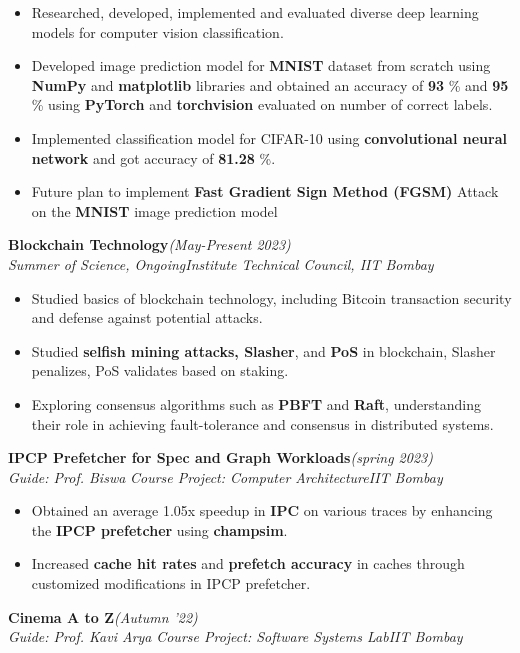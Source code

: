 \documentclass[10 pt]{article}
\begin{document}
		\begin{itemize}[itemsep = -0.8 mm, leftmargin=*]
		\vspace{-16pt}
		\item  Researched, developed, implemented and evaluated diverse deep learning models for computer vision classification.
		\item Developed image prediction model for \textbf{MNIST} dataset from scratch using \textbf{NumPy} and \textbf{matplotlib} libraries
  and obtained an accuracy of \textbf{93} \% and \textbf{95} \% using \textbf{PyTorch} and \textbf{torchvision} evaluated on number of correct labels.
		\item Implemented classification model for CIFAR-10 using \textbf{convolutional neural network} and got accuracy of \textbf{81.28} \%.
		\item  Future plan to implement \textbf{Fast Gradient Sign Method (FGSM)} Attack on the \textbf{MNIST} image prediction model
	\end{itemize}
 {\selectfont
		\textbf{{Blockchain Technology}}\hfill{\sl \small (May-Present 2023)}\\
	}{\it Summer of Science, Ongoing}\hfill{\sl \small Institute Technical Council, IIT Bombay}\\

		\begin{itemize}[itemsep = -0.8 mm, leftmargin=*]
		\vspace{-16pt}
		\item  Studied basics of blockchain technology, including Bitcoin transaction security and defense against potential attacks.
  \item Studied \textbf{selfish mining attacks, Slasher}, and \textbf{PoS} in blockchain, Slasher penalizes, PoS validates based on staking.
  \item Exploring consensus algorithms such as \textbf{PBFT} and \textbf{Raft}, understanding their role in achieving fault-tolerance and consensus in distributed systems.
	\end{itemize}
 	{\selectfont
		\textbf{{IPCP Prefetcher for Spec and Graph Workloads}}\hfill{\sl \small (spring 2023)}\\
	}{\it Guide: Prof. Biswa \textbar} {\it Course Project:  Computer Architecture}\hfill{\sl \small IIT Bombay}\\
	\begin{itemize}[itemsep = -0.8 mm, leftmargin=*]
		\vspace{-16pt}
		\item Obtained an average 1.05x speedup in \textbf{IPC} on various traces by enhancing the \textbf{IPCP prefetcher} using \textbf{champsim}.
		\item Increased \textbf{cache hit rates} and \textbf{prefetch accuracy} in caches through customized modifications in IPCP prefetcher.
	\end{itemize}
{\selectfont
		\textbf{{Cinema A to Z}}\hfill{\sl \small (Autumn '22)}\\
	}{\it Guide: Prof. Kavi Arya \textbar} {\it Course Project: Software Systems Lab}\hfill{\sl \small IIT Bombay}\\
\end{document}
